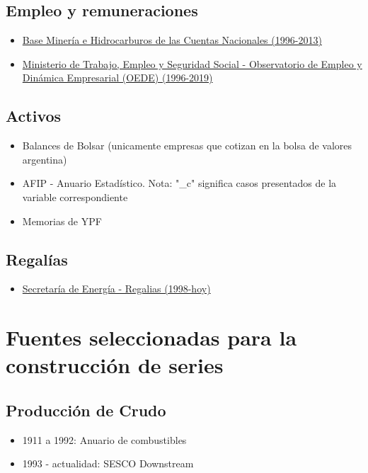 \documentclass[letterpaper,11pt, spanish]{scrartcl}
\begin{document}
\subsection{Empleo y remuneraciones}

\begin{itemize}
    \item \hyperlink{}{Base Minería e Hidrocarburos de las Cuentas Nacionales (1996-2013)}
    \item \hyperlink{http://www.trabajo.gob.ar/estadisticas/oede/estadisticasnacionales.asp}{Ministerio de Trabajo, Empleo y Seguridad Social - Observatorio de Empleo y Dinámica Empresarial (OEDE) (1996-2019)}
\end{itemize}


\subsection{Activos}
\begin{itemize}
    \item Balances de Bolsar (unicamente empresas que cotizan en la bolsa de valores argentina)
    \item AFIP - Anuario Estadístico. Nota: "\_c" significa casos presentados de la variable correspondiente
    \item Memorias de YPF
\end{itemize}

\subsection{Regalías}
\begin{itemize}
    \item \hyperlink{http://datos.minem.gob.ar/dataset/regalias-de-petroleo-crudo-gas-natural-glp-gasolina-y-condensado}{Secretaría de Energía - Regalias (1998-hoy)}
\end{itemize}

\section{Fuentes seleccionadas para la construcción de series}

\subsection{Producción de Crudo} 
\begin{itemize}
    \item 1911 a 1992: Anuario de combustibles
    \item 1993 - actualidad: SESCO Downstream
\end{itemize} 
 
\end{document}
